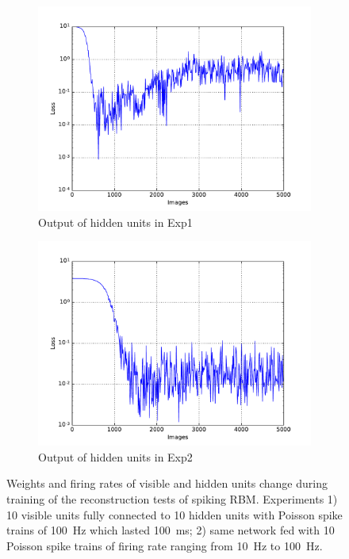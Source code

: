 \begin{figure}
\begin{subfigure}[t]{0.4\textwidth}
		\includegraphics[width=\textwidth]{pics_sdlm/11_exp_SRBM_Orig_long/exp1_mse_nons.pdf}
		\caption{Output of hidden units in Exp1}
	\end{subfigure}
	\begin{subfigure}[t]{0.4\textwidth}
		\includegraphics[width=\textwidth]{pics_sdlm/11_exp_SRBM_Orig_long/exp2_mse_nons.pdf}
		\caption{Output of hidden units in Exp2}
	\end{subfigure}
	\caption{Weights and firing rates of visible and hidden units change during training of the reconstruction tests of spiking RBM. 
		Experiments 1) 10 visible units fully connected to 10 hidden units with Poisson spike trains of 100~Hz which lasted 100~ms; 2) same network fed with 10 Poisson spike trains of firing rate ranging from 10~Hz to 100~Hz.}
\end{figure}
